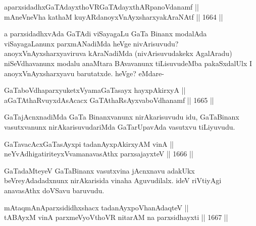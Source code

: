 
\begin{shl}
aparxsidadhxGaTAdayxthoVR\s GaTAdayxthARpanoVdanamf || \\
mAneVneVha kathaM kuyARdanoyxVnAyxsharxyakAraNAtf \hfill || 1664 ||  
\end{shl}

\begin{artha}
a parxsidadhxvAda GaTAdi viSayagaLu GaTa Binanx modalAda viSayagaLanunx parxmANadiMda heVge nivArisuvudu? anoyxVnAyxsharxyaviruva kAraNadiMda (nivArisuvudakekx AgalAradu) niSeVdhavanunx modalu anaMtara BAvavanunx tiLisuvudeMba pakaSxdalUlx I anoyxVnAyxsharxyavu barutatxde. heVge? eMdare-
\end{artha}

\begin{shl}
GaTaboVdhaparxyuketxVyamaGaTasayx hayxpAkirxyA ||  \\
aGaTAthaRvuyxdAsAcacx GaTAthaRsAyxvaboVdhanamf  \hfill || 1665 ||  
\end{shl}

\begin{artha}
GaTajAcnxnadiMda GaTa Binanxvanunx nirAkarisuvudu idu, GaTaBinanx vasutxvanunx nirAkarisuvudariMda GaTarUpavAda vasutxvu tiLiyuvudu.
\end{artha}


\begin{shl}
GaTavacAcxGaTasAyxpi tadanAyxpAkirxyAM vinA || \\
neYvAdhigatiriteyxVvamanavasAthx parxsajayxteV \hfill || 1666 || 
\end{shl}

\begin{artha}
GaTadaMteyeV GaTaBinanx vasutxvina jAcnxnavu adakUkx beVreyAdadadxnunx nirAkarisida vinaha Aguvudilalx. ideV riVtiyAgi anavasAthx doVSavu baruvudu.
\end{artha}


\begin{shl}
mAtaqmAnAparxsididhxshacx tadanAyxpoVhanAdaqteV || \\
tABAyxM vinA parxmeVyoV\s thoVR nitarAM na parxsidhayxti \hfill || 1667 ||  
\end{shl}

